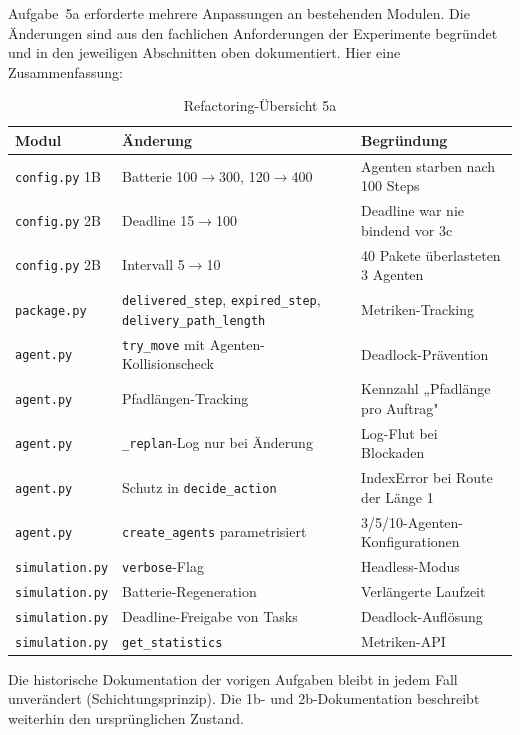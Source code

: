 Aufgabe~5a erforderte mehrere Anpassungen an bestehenden Modulen. Die Änderungen sind aus den fachlichen Anforderungen der Experimente begründet und in den jeweiligen Abschnitten oben dokumentiert. Hier eine Zusammenfassung:

\begin{table}[H]
    \centering
    \scriptsize
    \begin{tabular}{l l l}
        \toprule
        \textbf{Modul} & \textbf{Änderung} & \textbf{Begründung} \\
        \midrule
        \texttt{config.py} 1B & Batterie 100\(\to\)300, 120\(\to\)400 & Agenten starben nach 100 Steps \\
        \texttt{config.py} 2B & Deadline 15\(\to\)100 & Deadline war nie bindend vor 3c \\
        \texttt{config.py} 2B & Intervall 5\(\to\)10 & 40 Pakete überlasteten 3 Agenten \\
        \texttt{package.py} & \texttt{delivered\_step}, \texttt{expired\_step}, \texttt{delivery\_path\_length} & Metriken-Tracking \\
        \texttt{agent.py} & \texttt{try\_move} mit Agenten-Kollisionscheck & Deadlock-Prävention \\
        \texttt{agent.py} & Pfadlängen-Tracking & Kennzahl „Pfadlänge pro Auftrag" \\
        \texttt{agent.py} & \texttt{\_replan}-Log nur bei Änderung & Log-Flut bei Blockaden \\
        \texttt{agent.py} & Schutz in \texttt{decide\_action} & IndexError bei Route der Länge 1 \\
        \texttt{agent.py} & \texttt{create\_agents} parametrisiert & 3/5/10-Agenten-Konfigurationen \\
        \texttt{simulation.py} & \texttt{verbose}-Flag & Headless-Modus \\
        \texttt{simulation.py} & Batterie-Regeneration & Verlängerte Laufzeit \\
        \texttt{simulation.py} & Deadline-Freigabe von Tasks & Deadlock-Auflösung \\
        \texttt{simulation.py} & \texttt{get\_statistics} & Metriken-API \\
        \bottomrule
    \end{tabular}
    \caption{Refactoring-Übersicht 5a}
    \label{tab:refactoring_5a}
\end{table}

Die historische Dokumentation der vorigen Aufgaben bleibt in jedem Fall unverändert (Schichtungsprinzip). Die 1b- und 2b-Dokumentation beschreibt weiterhin den ursprünglichen Zustand.

